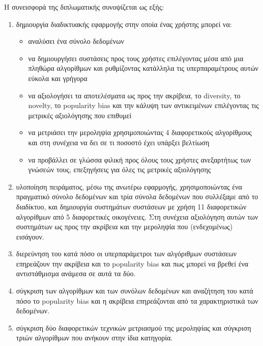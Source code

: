 \noindent Η συνεισφορά της διπλωματικής συνοψίζεται ως εξής:
\begin{enumerate}
	\item δημιουργία διαδικτυακής εφαρμογής στην οποία ένας χρήστης μπορεί να: \begin{itemize}
		\item αναλύσει ένα σύνολο δεδομένων
		\item να δημιουργήσει συστάσεις προς τους χρήστες επιλέγοντας μέσα από μια πληθώρα αλγορίθμων και ρυθμίζοντας κατάλληλα τις υπερπαραμέτρους αυτών εύκολα και γρήγορα
		\item να αξιολογήσει τα αποτελέσματα ως προς την ακρίβεια, το diversity, το novelty, το popula\-rity bias και την κάλυψη των αντικειμένων επιλέγοντας τις μετρικές αξιολόγησης που επιθυμεί
		\item να μετριάσει την μεροληψία χρησιμοποιώντας 4 διαφορετικούς αλγορίθμους και στη συνέχεια να δει σε τι ποσοστό έχει υπάρξει βελτίωση
		\item να προβάλλει σε γλώσσα φιλική προς όλους τους χρήστες ανεξαρτήτως των γνώσεών τους, επεξηγήσεις για όλες τις μετρικές αξιολόγησης 
	\end{itemize}
		\item	υλοποίηση πειράματος, μέσω της ανωτέρω εφαρμογής, χρησιμοποιώντας ένα πραγματικό σύνολο δεδομένων και τρία σύνολα δεδομένων που συλλέξαμε από το διαδίκτυο, και δημιουργία συστημάτων συστάσεων με χρήση 11 διαφορετικών αλγορίθμων από 5 διαφορετικές οικογένειες. Στη συνέχεια αξιολόγηση αυτών των συστημάτων ως προς την ακρίβεια και την μεροληψία που (ενδεχομένως) εισάγουν.
		\item	διερεύνηση του κατά πόσο οι υπερπαράμετροι των αλγόριθμων συστάσεων επηρεάζουν την ακρίβεια και το popularity bias και πως μπορεί να βρεθεί ένα αντιστάθμισμα ανάμεσα σε αυτά τα δύο.
		\item	σύγκριση των αλγορίθμων και των συνόλων δεδομένων και αναζήτηση του κατά πόσο το popula\-rity bias και η ακρίβεια επηρεάζονται από τα χαρακτηριστικά των δεδομένων.
		\item	σύγκριση δύο διαφορετικών τεχνικών μετριασμού της μεροληψίας και σύγκριση τριών αλγορίθμων που ανήκουν στην ίδια κατηγορία.

\end{enumerate}


